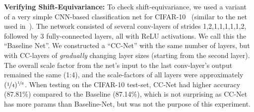 



\textbf{Verifying Shift-Equivariance:}
To check shift-equivariance, we used a variant of a very simple CNN-based classification net for CIFAR-10~\cite{CIFAR10} (similar to the net used in~\cite{wong2018scaling, atzmon2019controlling}). The network consisted of several conv-layers of strides 1,2,1,1,1,1,1,2, followed by 3 fully-connected layers, all with ReLU activations. We call this the ``Baseline Net''.
%
We constructed a ``CC-Net'' 
with the same number of layers, but with CC-layers of \emph{gradually} changing layer sizes (starting from the second layer). The overall scale factor from the net's input to the last conv-layer's output remained the same (1:4), and the scale-factors of all layers were approximately ${(\nicefrac{1}{4})^{\nicefrac{1}{6}}}$. When testing on the CIFAR-10 test-set, CC-Net had higher accuracy (87.81\%) compared to the Baseline (87.14\%), which is not surprising as CC-Net has more params than Baseline-Net, but was not the purpose of this experiment. 

